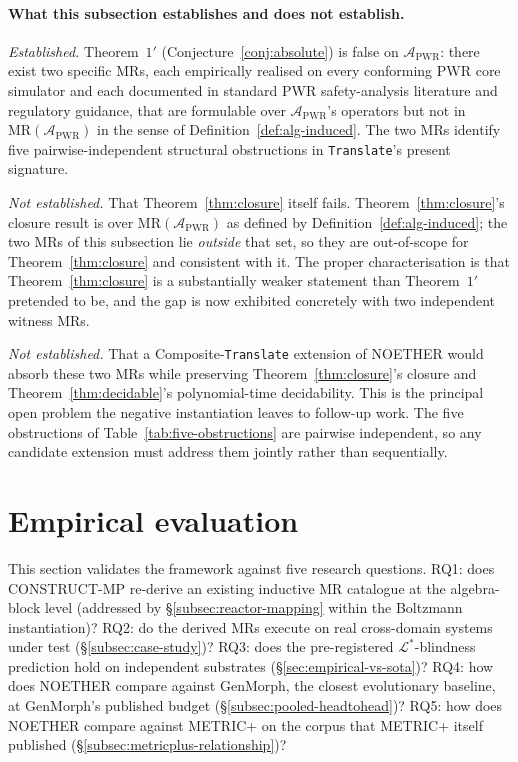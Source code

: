 \documentclass[acmsmall, screen]{acmart}
\begin{document}
\paragraph{What this subsection establishes and does not establish.}
\emph{Established.} Theorem~$1'$ (Conjecture~\ref{conj:absolute}) is false on $\mathcal{A}_{\mathrm{PWR}}$: there exist two specific MRs, each empirically realised on every conforming PWR core simulator and each documented in standard PWR safety-analysis literature and regulatory guidance, that are formulable over $\mathcal{A}_{\mathrm{PWR}}$'s operators but not in $\mathrm{MR}(\mathcal{A}_{\mathrm{PWR}})$ in the sense of Definition~\ref{def:alg-induced}. The two MRs identify five pairwise-independent structural obstructions in \texttt{Translate}'s present signature.

\emph{Not established.} That Theorem~\ref{thm:closure} itself fails. Theorem~\ref{thm:closure}'s closure result is over $\mathrm{MR}(\mathcal{A}_{\mathrm{PWR}})$ as defined by Definition~\ref{def:alg-induced}; the two MRs of this subsection lie \emph{outside} that set, so they are out-of-scope for Theorem~\ref{thm:closure} and consistent with it. The proper characterisation is that Theorem~\ref{thm:closure} is a substantially weaker statement than Theorem~$1'$ pretended to be, and the gap is now exhibited concretely with two independent witness MRs.

\emph{Not established.} That a Composite-\texttt{Translate} extension of NOETHER would absorb these two MRs while preserving Theorem~\ref{thm:closure}'s closure and Theorem~\ref{thm:decidable}'s polynomial-time decidability. This is the principal open problem the negative instantiation leaves to follow-up work. The five obstructions of Table~\ref{tab:five-obstructions} are pairwise independent, so any candidate extension must address them jointly rather than sequentially.


\section{Empirical evaluation}
\label{sec:empirical-evaluation}

This section validates the framework against five research questions. RQ1: does CONSTRUCT-MP re-derive an existing inductive MR catalogue at the algebra-block level (addressed by \S\ref{subsec:reactor-mapping} within the Boltzmann instantiation)? RQ2: do the derived MRs execute on real cross-domain systems under test (\S\ref{subsec:case-study})? RQ3: does the pre-registered \(\mathcal{L}^{*}\)-blindness prediction hold on independent substrates (\S\ref{sec:empirical-vs-sota})? RQ4: how does NOETHER compare against GenMorph, the closest evolutionary baseline, at GenMorph's published budget (\S\ref{subsec:pooled-headtohead})? RQ5: how does NOETHER compare against METRIC+ on the corpus that METRIC+ itself published (\S\ref{subsec:metricplus-relationship})?
\end{document}

